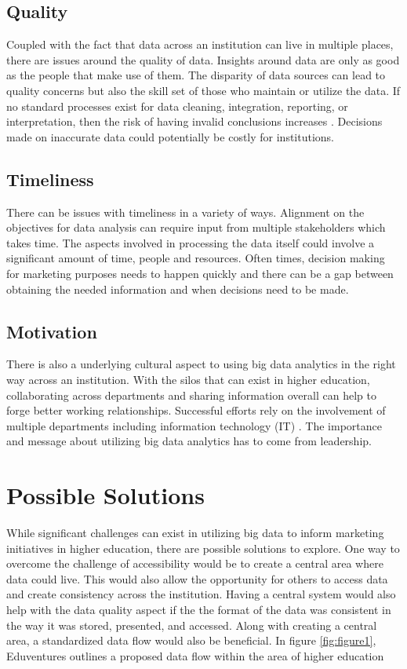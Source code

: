 \documentclass[sigconf]{acmart}
\begin{document}
\subsection{Quality}
Coupled with the fact that data across an institution can live in multiple places, there are issues around the quality of data. Insights around data are only as good as the people that make use of them. The disparity of data sources can lead to quality concerns but also the skill set of those who maintain or utilize the data. If no standard processes exist for data cleaning, integration, reporting, or interpretation, then the risk of having invalid conclusions increases \cite{Marsh2006}. Decisions made on inaccurate data could potentially be costly for institutions. 

\subsection{Timeliness}
There can be issues with timeliness in a variety of ways. Alignment on the objectives for data analysis can require input from multiple stakeholders which takes time. The aspects involved in processing the data itself could involve a significant amount of time, people and resources. Often times, decision making for marketing purposes needs to happen quickly and there can be a gap between obtaining the needed information and when decisions need to be made. 

\subsection{Motivation}
There is also a underlying cultural aspect to using big data analytics in the right way across an institution. With the silos that can exist in higher education, collaborating across departments and sharing information overall can help to forge better working relationships. Successful efforts rely on the involvement of multiple departments including information technology (IT) \cite{Daniel2015}. The importance and message about utilizing big data analytics has to come from leadership. 

\section{Possible Solutions}

While significant challenges can exist in utilizing big data to inform marketing initiatives in higher education, there are possible solutions to explore.  One way to overcome the challenge of accessibility would be to create a central area where data could live. This would also allow the opportunity for others to access data and create consistency across the institution. Having a central system would also help with the data quality aspect if the the format of the data was consistent in the way it was stored, presented, and accessed. Along with creating a central area, a standardized data flow would also be beneficial. In figure \ref{fig:figure1}, Eduventures outlines a proposed data flow within the area of higher education
\end{document}
